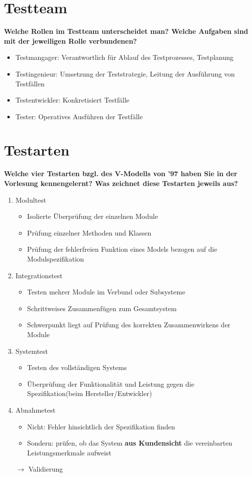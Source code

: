 \section{Testteam}
\textbf{Welche Rollen im Testteam unterscheidet man? Welche Aufgaben sind mit der jeweiligen Rolle verbundenen?}
\begin{itemize}
    \item Testmangager: Verantwortlich für Ablauf des Testprozesses, Testplanung
    \item Testingenieur: Umsetzung der Teststrategie, Leitung der Ausführung von Testfällen
    \item Testentwickler: Konkretisiert Testfälle
    \item Tester: Operatives Ausführen der Testfälle
\end{itemize}

\section{Testarten}
\textbf{Welche vier Testarten bzgl. des V-Modells von '97 haben Sie in der Vorlesung kennengelernt? Was zeichnet diese Testarten jeweils aus?}
\begin{enumerate}
    \item Modultest\begin{itemize}
              \item Isolierte Überprüfung der einzelnen Module
              \item Prüfung einzelner Methoden und Klassen
              \item Prüfung der fehlerfreien Funktion eines Models bezogen auf die Modulspezifikation
          \end{itemize}
    \item Integrationstest\begin{itemize}
              \item Testen mehrer Module im Verbund oder Subsysteme
              \item Schrittweises Zusammenfügen zum Gesamtsystem
              \item Schwerpunkt liegt auf Prüfung des korrekten Zusammenwirkens der Module
          \end{itemize}
    \item Systemtest\begin{itemize}
              \item Testen des vollständigen Systems
              \item Überprüfung der Funktionalität und Leistung gegen die Spezifikation(beim Hersteller/Entwickler)
          \end{itemize}
    \item Abnahmetest\begin{itemize}
              \item Nicht: Fehler hinsichtlich der Spezifikation finden
              \item Sondern: prüfen, ob das System \textbf{aus Kundensicht} die vereinbarten Leistungsmerkmale aufweist
          \end{itemize}
          $\rightarrow$ Validierung
\end{enumerate}
